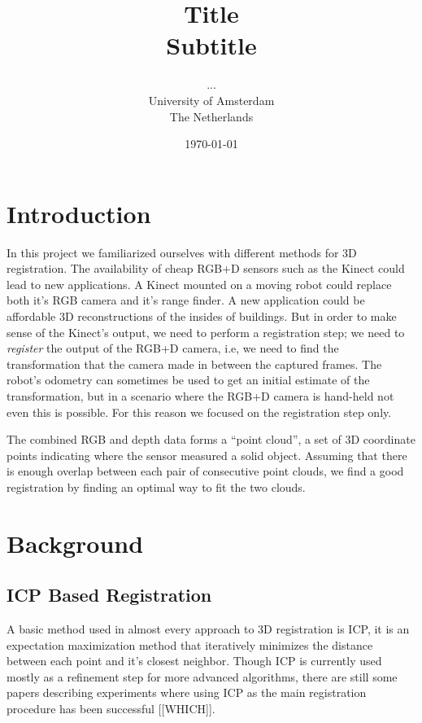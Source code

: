 \documentclass[a4paper]{article}
\title{Title\\
{\large Subtitle}}
\author{...\\
  University of Amsterdam\\
  The Netherlands}
\date{\today}
\begin{document}
\maketitle



\section{Introduction}

In this project we familiarized ourselves with different methods for 3D registration. The availability of cheap RGB+D sensors such as the Kinect could lead to new applications. A Kinect mounted on a moving robot could replace both it's RGB camera and it's range finder. A new application could be affordable 3D reconstructions of the insides of buildings. But in order to make sense of the Kinect's output, we need to perform a registration step; we need to \emph{register} the output of the RGB+D camera, i.e, we need to find the transformation that the camera made in between the captured frames. The robot's odometry can sometimes be used to get an initial estimate of the transformation, but in a scenario where the RGB+D camera is hand-held not even this is possible. For this reason we focused on the registration step only. 

The combined RGB and depth data forms a ``point cloud'', a set of 3D coordinate points indicating where the sensor measured a solid object. Assuming that there is enough overlap between each pair of consecutive point clouds, we find a good registration by finding an optimal way to fit the two clouds.


\section{Background}

\subsection{ICP Based Registration}

A basic method used in almost every approach to 3D registration is \ac{ICP}\cite{besl1992method}, it is an expectation maximization method that iteratively minimizes the distance between each point and it's closest neighbor. Though \ac{ICP} is currently used mostly as a refinement step for more advanced algorithms, there are still some papers describing experiments where using \ac{ICP} as the main registration procedure has been successful [[WHICH]]. 
\end{document}
